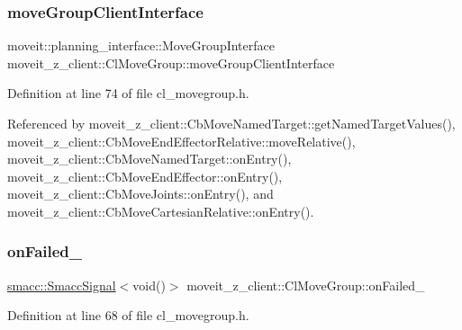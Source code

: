 \subsubsection{\texorpdfstring{move\+Group\+Client\+Interface}{moveGroupClientInterface}}
{\footnotesize\ttfamily moveit\+::planning\+\_\+interface\+::\+Move\+Group\+Interface moveit\+\_\+z\+\_\+client\+::\+Cl\+Move\+Group\+::move\+Group\+Client\+Interface}



Definition at line 74 of file cl\+\_\+movegroup.\+h.



Referenced by moveit\+\_\+z\+\_\+client\+::\+Cb\+Move\+Named\+Target\+::get\+Named\+Target\+Values(), moveit\+\_\+z\+\_\+client\+::\+Cb\+Move\+End\+Effector\+Relative\+::move\+Relative(), moveit\+\_\+z\+\_\+client\+::\+Cb\+Move\+Named\+Target\+::on\+Entry(), moveit\+\_\+z\+\_\+client\+::\+Cb\+Move\+End\+Effector\+::on\+Entry(), moveit\+\_\+z\+\_\+client\+::\+Cb\+Move\+Joints\+::on\+Entry(), and moveit\+\_\+z\+\_\+client\+::\+Cb\+Move\+Cartesian\+Relative\+::on\+Entry().

\mbox{\label{classmoveit__z__client_1_1ClMoveGroup_ab9f19c609cfa111748bc16d497dffe9a}} 
\subsubsection{\texorpdfstring{on\+Failed\+\_\+}{onFailed\_}}
{\footnotesize\ttfamily \hyperlink{classsmacc_1_1SmaccSignal}{smacc\+::\+Smacc\+Signal}$<$void()$>$ moveit\+\_\+z\+\_\+client\+::\+Cl\+Move\+Group\+::on\+Failed\+\_\+\hspace{0.3cm}{\ttfamily [private]}}



Definition at line 68 of file cl\+\_\+movegroup.\+h.

\mbox{\label{classmoveit__z__client_1_1ClMoveGroup_a77804970cc1e2ae64e26dabbf556352d}} 
